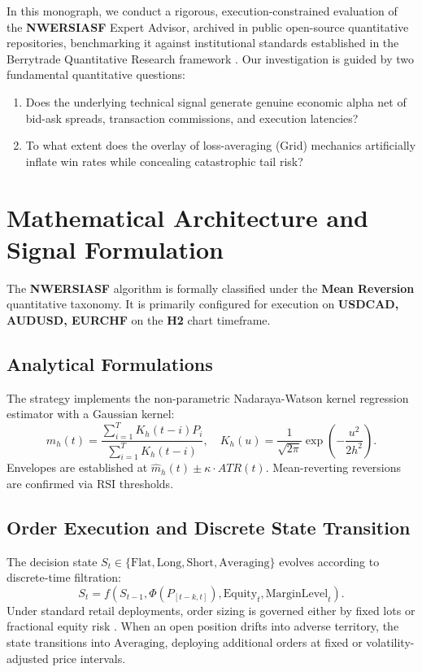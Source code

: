 \documentclass[11pt,a4paper]{article}
\begin{document}
In this monograph, we conduct a rigorous, execution-constrained evaluation of the \textbf{NWERSIASF} Expert Advisor, archived in public open-source quantitative repositories, benchmarking it against institutional standards established in the Berrytrade Quantitative Research framework \cite{artsu2026illusion}. Our investigation is guided by two fundamental quantitative questions:
\begin{enumerate}
    \item Does the underlying technical signal generate genuine economic alpha net of bid-ask spreads, transaction commissions, and execution latencies?
    \item To what extent does the overlay of loss-averaging (Grid) mechanics artificially inflate win rates while concealing catastrophic tail risk?
\end{enumerate}

\section{Mathematical Architecture and Signal Formulation}
The \textbf{NWERSIASF} algorithm is formally classified under the \textbf{Mean Reversion} quantitative taxonomy. It is primarily configured for execution on \textbf{USDCAD, AUDUSD, EURCHF} on the \textbf{H2} chart timeframe.

\subsection{Analytical Formulations}

The strategy implements the non-parametric Nadaraya-Watson kernel regression estimator \cite{nadaraya1964estimating, watson1964smooth} with a Gaussian kernel:
\begin{equation}
\hat{m}_h(t) = \frac{\sum_{i=1}^T K_h(t - i) P_i}{\sum_{i=1}^T K_h(t - i)}, \quad K_h(u) = \frac{1}{\sqrt{2\pi}} \exp\left(-\frac{u^2}{2h^2}\right).
\end{equation}
Envelopes are established at $\hat{m}_h(t) \pm \kappa \cdot ATR(t)$. Mean-reverting reversions are confirmed via RSI thresholds.


\subsection{Order Execution and Discrete State Transition}
The decision state $S_t \in \{\text{Flat}, \text{Long}, \text{Short}, \text{Averaging}\}$ evolves according to discrete-time filtration:
\begin{equation}
S_{t} = f(S_{t-1}, \Phi(P_{[t-k, t]}), \text{Equity}_t, \text{MarginLevel}_t).
\end{equation}
Under standard retail deployments, order sizing is governed either by fixed lots or fractional equity risk \cite{lopez2018advances, carhart1997persistence}. When an open position drifts into adverse territory, the state transitions into $\text{Averaging}$, deploying additional orders at fixed or volatility-adjusted price intervals.
\end{document}
